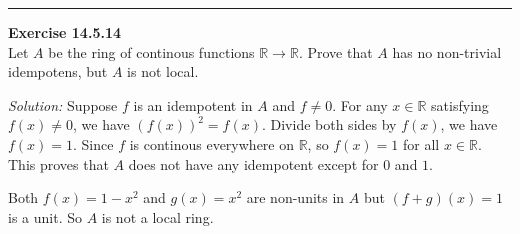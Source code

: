 \documentclass[a4paper, 12pt]{article}
\newenvironment{problem}[2][Exercise]
    { \begin{mdframed}[backgroundcolor=gray!20] \textbf{#1 #2} \\}
    {  \end{mdframed}}
\newenvironment{solution}
    {\textit{Solution:}}
    {}
\begin{document}
\noindent\rule{7in}{2.8pt}
\begin{problem}{14.5.14}
Let \(A\) be the ring of continous functions \(\mathbb{R}\rightarrow \mathbb{R}\). Prove that \(A\) has no non-trivial idempotens, but \(A\) is not local.
\end{problem}
\begin{solution}
Suppose \(f\) is an idempotent in \(A\) and \(f\neq 0\). For any \(x\in \mathbb{R}\) satisfying \(f(x)\neq 0\), we have \((f(x))^2=f(x)\). Divide both sides by \(f(x)\), we have 
\(f(x)=1\). Since \(f\) is continous everywhere on \(\mathbb{R}\), so \(f(x)=1\) for all \(x\in \mathbb{R}\). This proves that \(A\) does not have any idempotent except for \(0\) and \(1\).

Both \(f(x)=1-x^2\) and \(g(x)=x^2\) are non-units in \(A\) but \((f+g)(x)=1\) is a unit. So \(A\) is not a local ring.
\end{solution}
\end{document}
